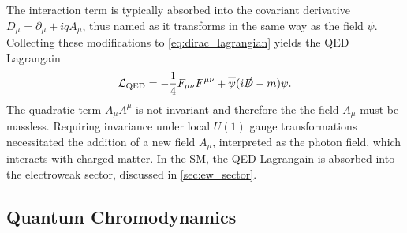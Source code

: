 The interaction term is typically absorbed into the covariant derivative $D_\mu = \partial_\mu + i q A_\mu$, thus named as it transforms in the same way as the field $\psi$.
Collecting these modifications to \cref{eq:dirac_lagrangian} yields the QED Lagrangain
%
\begin{equation}\label{eq:qed_lagrangian}
  \mathcal{L}_{\textnormal{QED}} = -\frac{1}{4} F_{\mu\nu} F^{\mu\nu} + \overline{\psi} (i \slashed{D} - m )\psi .
\end{equation}
%
The quadratic term $A_\mu A^\mu$ is not invariant and therefore the the field $A_\mu$ must be massless.
Requiring invariance under local $U(1)$ gauge transformations necessitated the addition of a new field $A_\mu$, interpreted as the photon field, which interacts with charged matter.
In the SM, the QED Lagrangain is absorbed into the electroweak sector, discussed in \cref{sec:ew_sector}.


\subsection{Quantum Chromodynamics}\label{sec:qcd}

